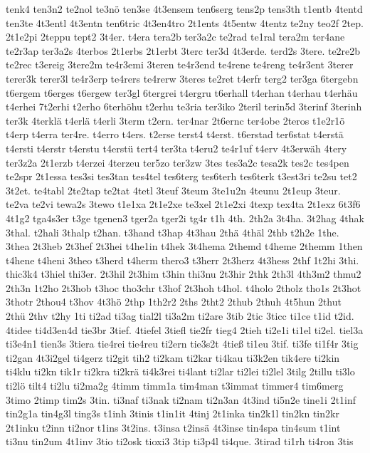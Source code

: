 {tenk4
ten3n2
te2nol
te3nö
ten3se
4t3ensem
ten6serg
tens2p
tens3th
t1entb
4tentd
ten3te
4t3entl
4t3entn
ten6tric
4t3en4tro
2t1ents
4t5entw
4tentz
te2ny
teo2f
2tep.
2t1e2pi
2teppu
tept2
3t4er.
t4era
tera2b
ter3a2c
te2rad
te1ral
tera2m
ter4ane
te2r3ap
ter3a2s
4terbos
2t1erbs
2t1erbt
3terc
ter3d
4t3erde.
terd2s
3tere.
te2re2b
te2rec
t3ereig
3tere2m
te4r3emi
3teren
te4r3end
te4rene
te4reng
te4r3ent
3terer
terer3k
terer3l
te4r3erp
te4rers
te4rerw
3teres
te2ret
t4erfr
terg2
ter3ga
6tergebn
t6ergem
t6erges
t6ergew
ter3gl
6tergrei
t4ergru
t6erhall
t4erhan
t4erhau
t4erhäu
t4erhei
7t2erhi
t2erho
6terhöhu
t2erhu
te3ria
ter3iko
2teril
terin5d
3terinf
3terinh
ter3k
4terklä
t4erlä
t4erli
3term
t2ern.
ter4nar
2t6ernc
ter4obe
2teros
t1e2r1ö
t4erp
t4erra
ter4re.
t4erro
t4ers.
t2erse
terst4
t4erst.
t6erstad
ter6stat
t4erstä
t4ersti
t4erstr
t4erstu
t4erstü
tert4
ter3ta
t4eru2
te4r1uf
t4erv
4t3erwäh
4tery
ter3z2a
2t1erzb
t4erzei
4terzeu
ter5zo
ter3zw
3tes
tes3a2c
tesa2k
tes2c
tes4pen
te2spr
2t1essa
tes3si
tes3tan
tes4tel
tes6terg
tes6terh
tes6terk
t3est3ri
te2su
tet2
3t2et.
te4tabl
2te2tap
te2tat
4tetl
3teuf
3teum
3te1u2n
4teunu
2t1eup
3teur.
te2va
te2vi
tewa2s
3tewo
t1e1xa
2t1e2xe
te3xel
2t1e2xi
4texp
tex4ta
2t1exz
6t3f6
4t1g2
tga4s3er
t3ge
tgenen3
tger2a
tger2i
tg4r
t1h
4th.
2th2a
3t4ha.
3t2hag
4thak
3thal.
t2hali
3thalp
t2han.
t3hand
t3hap
4t3hau
2thä
4thäl
2thb
t2h2e
1the.
3thea
2t3heb
2t3hef
2t3hei
t4he1in
t4hek
3t4hema
2themd
t4heme
2themm
1then
t4hene
t4heni
3theo
t3herd
t4herm
thero3
t3herr
2t3herz
4t3hess
2thf
1t2hi
3thi.
thic3k4
t3hiel
thi3er.
2t3hil
2t3him
t3hin
thi3nu
2t3hir
2thk
2th3l
4th3m2
thmu2
2th3n
1t2ho
2t3hob
t3hoc
tho3chr
t3hof
2t3hoh
t4hol.
t4holo
2tholz
tho1s
2t3hot
3thotr
2thou4
t3hov
4t3hö
2thp
1th2r2
2ths
2tht2
2thub
2thuh
4t5hun
2thut
2thü
2thv
t2hy
1ti
ti2ad
ti3ag
tial2l
ti3a2m
ti2are
3tib
2tic
3ticc
ti1ce
t1id
t2id.
4tidee
ti4d3en4d
tie3br
3tief.
4tiefel
3tiefl
tie2fr
tieg4
2tieh
ti2e1i
ti1el
ti2el.
tiel3a
ti3e4n1
tien3s
3tiera
tie4rei
tie4reu
ti2ern
tie3s2t
4tieß
ti1eu
3tif.
ti3fe
ti1f4r
3tig
ti2gan
4t3i2gel
ti4gerz
ti2git
tih2
ti2kam
ti2kar
ti4kau
ti3k2en
tik4ere
ti2kin
ti4klu
ti2kn
tik1r
ti2kra
ti2krä
ti4k3rei
ti4lant
ti2lar
ti2lei
ti2lel
3tilg
2tillu
ti3lo
ti2lö
tilt4
ti2lu
ti2ma2g
4timm
timm1a
tim4man
t3immat
timmer4
tim6merg
3timo
2timp
tim2s
3tin.
ti3naf
ti3nak
ti2nam
ti2n3an
4t3ind
ti5n2e
tine1i
2t1inf
tin2g1a
tin4g3l
ting3s
t1inh
3tinis
t1in1it
4tinj
2t1inka
tin2k1l
tin2kn
tin2kr
2t1inku
t2inn
ti2nor
t1ins
3t2ins.
t3insa
t2insä
4t3inse
tin4spa
tin4sum
t1int
ti3nu
tin2um
4t1inv
3tio
ti2osk
tioxi3
3tip
ti3p4l
ti4que.
3tirad
ti1rh
ti4ron
3tis
}
